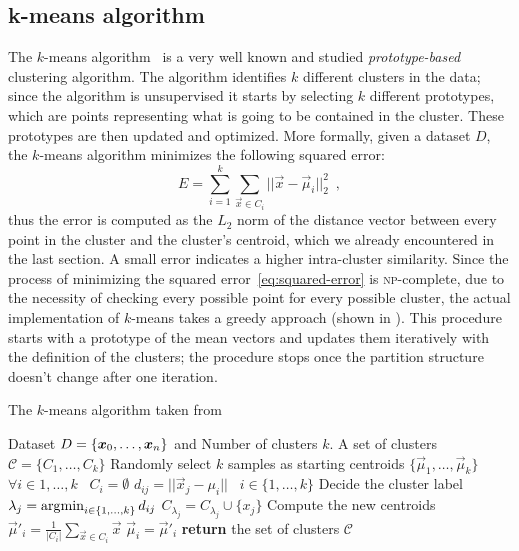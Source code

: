 \subsection{k-means algorithm}
The $k$-means algorithm~\cite{macqueen1967-kmeans, lloyd1982-kmeans} is a very well known and studied
\emph{prototype-based} clustering algorithm. The algorithm identifies $k$ different clusters in the
data; since the algorithm is unsupervised it starts by selecting $k$ different prototypes, which are
points representing what is going to be contained in the cluster. These prototypes are then updated
and optimized. More formally, given a dataset $D$, the $k$-means algorithm minimizes the following
squared error:
\begin{equation}
	\label{eq:squared-error}
	E = \sum_{i = 1}^k\sum_{\vec{x} \in C_i}||\vec{x} - \vec{\mu}_i||_2^2 \enspace,
\end{equation}
thus the error is computed as the $L_2$ norm of the distance vector between every point in the
cluster and the cluster's centroid, which we already encountered in the last section. A small error
indicates a higher intra-cluster similarity. Since the process of minimizing the squared
error~\ref{eq:squared-error} is \textsc{np}-complete, due to the necessity of checking every possible
point for every possible cluster, the actual implementation of $k$-means takes a greedy approach
(shown in ). This procedure starts with a prototype of the mean vectors and updates them iteratively with the definition of the clusters; the procedure stops once the partition structure doesn't change after one iteration.
\begin{algorithm}[!hb]
	\caption{The $k$-means algorithm taken from~\cite{ZhouZhi-Hua2021ML}}\label{algo:kmeans}
	\begin{algorithmic}[1]
		\Require Dataset $D = \{\boldsymbol{x}_0, \allowbreak\ldots\allowbreak, \boldsymbol{x}_n\}$ and Number of clusters $k$.
		\Ensure A set of clusters $\mathcal{C} = \{C_1, \ldots, C_k\}$
		\State Randomly select $k$ samples as starting centroids $\{\vec{\mu}_1, \ldots,
		\vec{\mu}_k\}$
		\State $\forall i \in {1, \ldots, k} \hspace{10pt} C_i = \emptyset$
		\State $d_{ij} = ||\vec{x}_j - \mu_i|| \hspace{10pt} i \in \{1, \ldots, k\}$ 
		\State Decide the cluster label $\lambda_j = \operatorname*{\arg\!\min}_{i \in \{1, \ldots, k\}}d_{ij}$
		\State $C_{\lambda_j} = C_{\lambda_j}\cup\{x_j\}$
		\EndFor
		\State Compute the new centroids $\vec{\mu}'_i = \frac{1}{|C_i|} \sum_{\vec{x} \in C_i}\vec{x}$
		\EndFor
		\State $\vec{\mu}_i = \vec{\mu}'_i$
		\EndIf
		\EndWhile
		\State \textbf{return} the set of clusters $\mathcal{C}$
		\EndFunction
	\end{algorithmic}
\end{algorithm}











